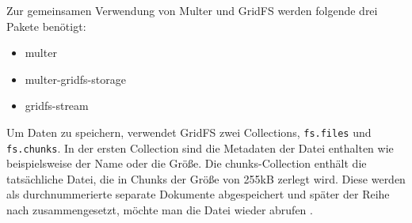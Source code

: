Zur gemeinsamen Verwendung von Multer und GridFS werden folgende drei Pakete benötigt:
\begin{itemize}
    \item multer
    \item multer-gridfs-storage
    \item gridfs-stream
\end{itemize}

Um Daten zu speichern, verwendet GridFS zwei Collections, \texttt{fs.files} und \texttt{fs.chunks}. In der ersten Collection sind die Metadaten der Datei enthalten wie beispielsweise der Name oder die Größe. Die chunks-Collection enthält die tatsächliche Datei, die in Chunks der Größe von 255kB zerlegt wird. Diese werden als durchnummerierte separate Dokumente abgespeichert und später der Reihe nach zusammengesetzt, möchte man die Datei wieder abrufen \cite{ganguli}. 
